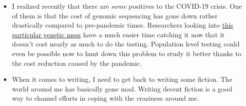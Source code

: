 \begin{itemize}
\item
  I realized recently that there are \emph{some} positives to the
  COVID-19 crisis. One of them is that the cost of genomic sequencing
  has gone down rather drastically compared to pre-pandemic times.
  Researchers looking into
  \href{https://ptenfoundation.org/what-is-pten/}{this particular
  genetic mess} have a much easier time catching it now that it doesn't
  cost nearly as much to do the testing. Population level testing could
  even be possible now to hunt down this problem to study it better
  thanks to the cost reduction caused by the pandemic.
\item
  When it comes to writing, I need to get back to writing some fiction.
  The world around me has basically gone mad. Writing decent fiction is
  a good way to channel efforts in coping with the craziness around me.
\end{itemize}
